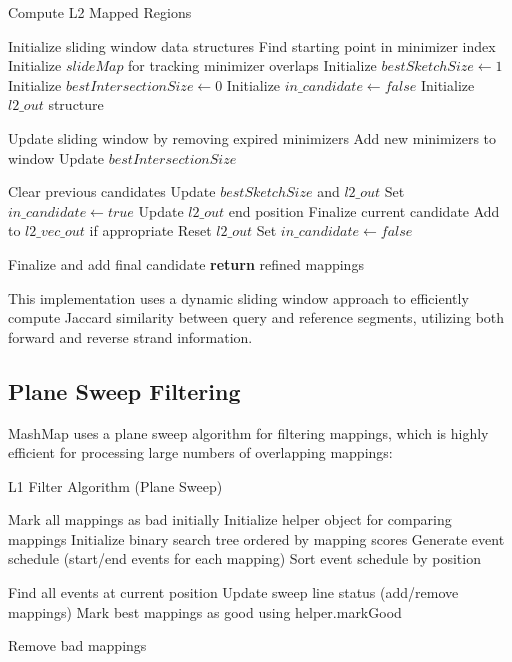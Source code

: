 \documentclass{article}
\begin{document}
\begin{algorithm}
\caption{Compute L2 Mapped Regions}
\begin{algorithmic}[1]
\State Initialize sliding window data structures
\State Find starting point in minimizer index
\State Initialize $slideMap$ for tracking minimizer overlaps
\State Initialize $bestSketchSize \gets 1$
\State Initialize $bestIntersectionSize \gets 0$
\State Initialize $in\_candidate \gets false$
\State Initialize $l2\_out$ structure

    \State Update sliding window by removing expired minimizers
    \State Add new minimizers to window
    \State Update $bestIntersectionSize$
    
        \State Clear previous candidates
        \State Update $bestSketchSize$ and $l2\_out$
        \State Set $in\_candidate \gets true$
        \State Update $l2\_out$ end position
    \Else
            \State Finalize current candidate
            \State Add to $l2\_vec\_out$ if appropriate
            \State Reset $l2\_out$
        \EndIf
        \State Set $in\_candidate \gets false$
    \EndIf
\EndWhile

    \State Finalize and add final candidate
\EndIf
\State \textbf{return} refined mappings
\EndProcedure
\end{algorithmic}
\end{algorithm}

This implementation uses a dynamic sliding window approach to efficiently compute Jaccard similarity between query and reference segments, utilizing both forward and reverse strand information.

\subsection{Plane Sweep Filtering}

MashMap uses a plane sweep algorithm for filtering mappings, which is highly efficient for processing large numbers of overlapping mappings:

\begin{algorithm}
\caption{L1 Filter Algorithm (Plane Sweep)}
\begin{algorithmic}[1]
\State Mark all mappings as bad initially
\State Initialize helper object for comparing mappings
\State Initialize binary search tree ordered by mapping scores
\State Generate event schedule (start/end events for each mapping)
\State Sort event schedule by position

    \State Find all events at current position
    \State Update sweep line status (add/remove mappings)
    \State Mark best mappings as good using helper.markGood
\EndFor

\State Remove bad mappings
\EndProcedure
\end{algorithmic}
\end{algorithm}
\end{document}
